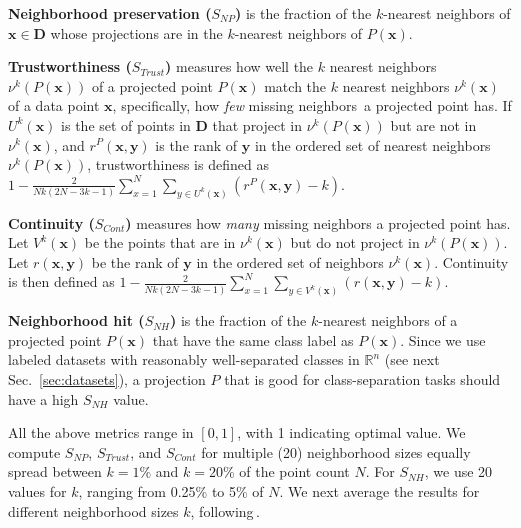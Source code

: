 \noindent\textbf{Neighborhood preservation ($S_{NP}$)} is the fraction of the $k$-nearest neighbors of $\mathbf{x} \in \mathbf{D}$ whose projections are in the $k$-nearest neighbors of $P(\mathbf{x})$.

\noindent\textbf{Trustworthiness ($S_{Trust}$)} measures how well the $k$ nearest neighbors $\nu^k(P(\mathbf{x}))$ of a projected point $P(\mathbf{x})$ match the $k$ nearest neighbors $\nu^k(\mathbf{x})$ of a data point $\mathbf{x}$, specifically, how \emph{few} missing neighbors\,\citep{Martins2014} a projected point has. If $U^k(\mathbf{x})$ is the set of points in $\mathbf{D}$ that project in $\nu^k(P(\mathbf{x}))$ but are not in $\nu^k(\mathbf{x})$,
and $r^P(\mathbf{x},\mathbf{y})$ is the rank of $\mathbf{y}$ in the ordered set of nearest neighbors $\nu^k(P(\mathbf{x}))$, trustworthiness is defined as \linebreak
$1-\frac{2}{N k(2 N-3 k-1)} \sum_{x=1}^{N} \sum_{y \in U^k(\mathbf{x})}(r^P(\mathbf{x}, \mathbf{y})-k)$.

\noindent\textbf{Continuity ($S_{Cont}$)} measures how \emph{many} missing neighbors a projected point has. Let $V^k(\mathbf{x})$
be the points that are in $\nu^k(\mathbf{x})$ but do not project in $\nu^k(P(\mathbf{x}))$. Let ${r}(\mathbf{x}, \mathbf{y})$ be the rank of $\mathbf{y}$ in the ordered set of neighbors $\nu^k(\mathbf{x})$. Continuity is then defined as \linebreak
$1-\frac{2}{N k(2 N-3 k-1)} \sum_{x=1}^{N} \sum_{y \in V^k(\mathbf{x})}({r}(\mathbf{x}, \mathbf{y})-k)$.

\noindent\textbf{Neighborhood hit ($S_{NH}$)} is the fraction of the $k$-nearest neighbors of a projected point $P(\mathbf{x})$ that have the same class label as $P(\mathbf{x})$. Since we use labeled datasets with reasonably well-separated classes in $\mathbb{R}^n$ (see next Sec.~\ref{sec:datasets}), a projection $P$ that is good for class-separation tasks should have a high $S_{NH}$ value.

All the above metrics range in $[0,1]$, with 1 indicating optimal value. 
We compute $S_{NP}$, $S_{Trust}$, and $S_{Cont}$ for multiple (20) neighborhood sizes equally spread between $k=1\%$ and $k=20\%$ of the point count $N$. For $S_{NH}$, we use 20 values for $k$, ranging from 0.25\% to 5\% of $N$. 
We next average the results for different neighborhood sizes $k$, following\,\citep{Vernier2020,Martins2015}.

